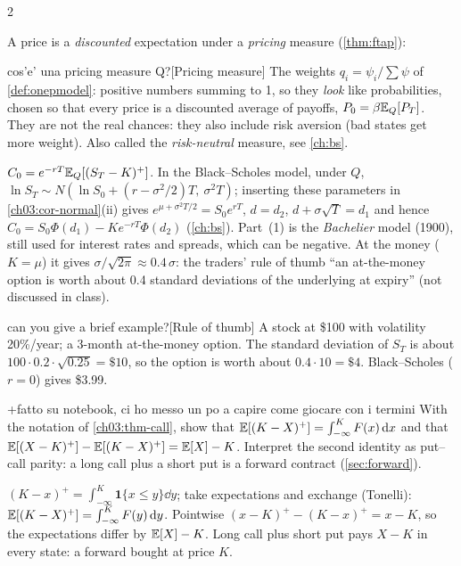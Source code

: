 \begin{paracol}{2}
\begin{finance}
A price is a \emph{discounted} expectation under a \emph{pricing} measure (\cref{thm:ftap}):\begin{answer}{cos'e' una pricing measure Q?}[Pricing measure]\label{ans:pricingQ}
The weights $q_i=\psi_i/\sum\psi$ of \cref{def:onepmodel}: positive numbers summing to 1, so they
\emph{look} like probabilities, chosen so that every price is a discounted average of payoffs,
$P_0=\beta\mathbb{E}_Q[P_T]$. They are not the real chances: they also include risk aversion (bad states get more
weight). Also called the \emph{risk-neutral} measure, see \cref{ch:bs}.
\end{answer}
$C_0=e^{-rT}\mathbb{E}_Q[(S_T-K)^+]$. In the Black--Scholes model, under $Q$, $\ln S_T\sim N(\ln S_0+(r-\sigma^2/2)T,\
\sigma^2T)$; inserting these parameters in \cref{ch03:cor-normal}(ii) gives $e^{\mu+\sigma^2T/2}=S_0e^{rT}$, $d=d_2$,
$d+\sigma\sqrt T=d_1$ and hence $C_0=S_0\Phi(d_1)-Ke^{-rT}\Phi(d_2)$ (\cref{ch:bs}). Part~(1) is the
\emph{Bachelier} model (1900), still used for interest rates and spreads, which can be negative. At the
money ($K=\mu$) it gives $\sigma/\sqrt{2\pi}\approx0.4\,\sigma$: the traders' rule of thumb ``an at-the-money
option is worth about 0.4 standard deviations of the underlying at expiry'' (not discussed in class).\begin{answer}{can you give a brief example?}[Rule of thumb]
A stock at \$100 with volatility 20\%/year; a 3-month at-the-money option. The standard deviation of $S_T$
is about $100\cdot0.2\cdot\sqrt{0.25}=\$10$, so the option is worth about $0.4\cdot10=\$4$. Black--Scholes
($r=0$) gives \$3.99.
\end{answer}
\end{finance}

\begin{exercise}[not from the course: puts and parity]\label{ch03:ex-parity}\note+{fatto su notebook, ci ho messo un po a capire come giocare con i termini}
With the notation of \cref{ch03:thm-call}, show that $\mathbb{E}[(K-X)^+]=\int_{-\infty}^KF(x)\,\mathrm{d} x$ and that
$\mathbb{E}[(X-K)^+]-\mathbb{E}[(K-X)^+]=\mathbb{E}[X]-K$. Interpret the second identity as put--call parity: a long call plus a short put is a
forward contract (\cref{sec:forward}).
\end{exercise}
\begin{solution}[ch03:ex-parity]
$(K-x)^+=\int_{-\infty}^K\mathbf 1\{x\le y\}\dd y$; take expectations and exchange (Tonelli): $\mathbb{E}[(K-X)^+]=\int_{-\infty}^K F(y)\,\mathrm{d} y$.
Pointwise $(x-K)^+-(K-x)^+=x-K$, so the expectations differ by $\mathbb{E}[X]-K$. Long call plus short put pays $X-K$ in
every state: a forward bought at price $K$.
\end{solution}


\end{paracol}
